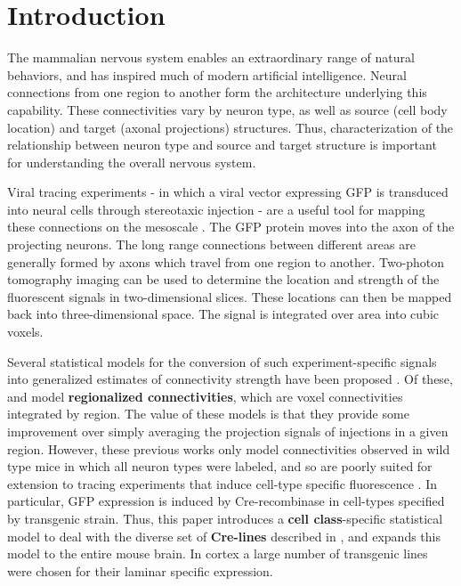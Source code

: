 \section{Introduction}
 
The mammalian nervous system enables an extraordinary range of natural behaviors, and has inspired much of modern artificial intelligence.
Neural connections from one region to another form the architecture underlying this capability.
These connectivities vary by neuron type, as well as source (cell body location) and target (axonal projections) structures.
Thus, characterization of the relationship between neuron type and source and target structure is important for understanding the overall nervous system.

Viral tracing experiments - in which a viral vector expressing GFP is transduced into neural cells through stereotaxic injection - are a useful tool for mapping these connections on the mesoscale \citep{Chamberlin1998-hi,Harris2012-fw, Daigle2018-gd}.
The GFP protein moves into the axon of the projecting neurons. The long range connections between different areas are generally formed by axons which travel from one region to another. 
Two-photon tomography imaging can be used to determine the location and strength of the fluorescent signals in two-dimensional slices.
These locations can then be mapped back into three-dimensional space.
The signal is integrated over area into cubic voxels.

Several statistical models for the conversion of such experiment-specific signals into generalized estimates of connectivity strength have been proposed \citep{Oh2014-kh, Harris2016-fn, Gamanut2018-sd, Knox2019-ot}.
Of these, \citet{Oh2014-kh} and \citet{Knox2019-ot} model \textbf{regionalized connectivities}, which are voxel connectivities integrated by region.
The value of these models is that they provide some improvement over simply averaging the projection signals of injections in a given region.
However, these previous works only model connectivities observed in wild type mice in which all neuron types were labeled, and so are poorly suited for extension to tracing experiments that induce cell-type specific fluorescence \citep{Harris2019-mr}.
In particular, GFP expression is induced by Cre-recombinase in cell-types specified by transgenic strain.
Thus, this paper introduces a \textbf{cell class}-specific statistical model to deal with the diverse set of \textbf{Cre-lines} described in \citet{Harris2019-mr}, and expands this model to the entire mouse brain. In cortex a large number of transgenic lines were chosen for their laminar specific expression.

